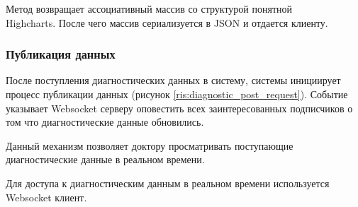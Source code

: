 Метод возвращает ассоциативный массив со структурой понятной \\ Highcharts.
После чего массив сериализуется в JSON и отдается клиенту.

\subsubsection{Публикация данных}
После поступления диагностических данных в систему, системы инициирует процесс
публикации данных (рисунок \ref{ris:diagnostic_post_request}).  Событие
указывает Websocket серверу оповестить всех заинтересованных подписчиков о том что диагностические данные обновились.

Данный механизм позволяет доктору просматривать поступающие диагностические
данные в реальном времени.

Для доступа к диагностическим данным в реальном времени используется Websocket
клиент.